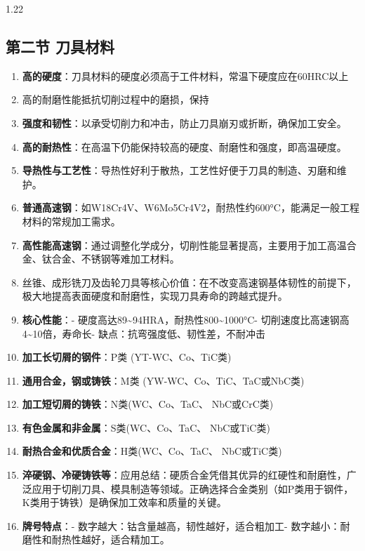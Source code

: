 \documentclass[12pt,a4paper]{article}
\begin{document}
\begin{spacing}{1.22}
\subsection{第二节 刀具材料}
\begin{tcolorbox}[colback=yellow!6,colframe=red!55!black,title=重点,left=1mm,right=1mm]
\begin{enumerate}[leftmargin=2.2em,label=\arabic*.]
  \item \textbf{高的硬度}：刀具材料的硬度必须高于工件材料，常温下硬度应在60HRC以上
  \item 高的耐磨性能抵抗切削过程中的磨损，保持
  \item \textbf{强度和韧性}：以承受切削力和冲击，防止刀具崩刃或折断，确保加工安全。
  \item \textbf{高的耐热性}：在高温下仍能保持较高的硬度、耐磨性和强度，即高温硬度。
  \item \textbf{导热性与工艺性}：导热性好利于散热，工艺性好便于刀具的制造、刃磨和维护。
  \item \textbf{普通高速钢}：如W18Cr4V、W6Mo5Cr4V2，耐热性约600°C，能满足一般工程材料的常规加工需求。
  \item \textbf{高性能高速钢}：通过调整化学成分，切削性能显著提高，主要用于加工高温合金、钛合金、不锈钢等难加工材料。
  \item 丝锥、成形铣刀及齿轮刀具等核心价值：在不改变高速钢基体韧性的前提下，极大地提高表面硬度和耐磨性，实现刀具寿命的跨越式提升。
  \item \textbf{核心性能}：- 硬度高达89\textasciitilde{}94HRA，耐热性800\textasciitilde{}1000°C- 切削速度比高速钢高4\textasciitilde{}10倍，寿命长- 缺点：抗弯强度低、韧性差，不耐冲击
  \item \textbf{加工长切屑的钢件}：P类 (YT-WC、Co、TiC类)
  \item \textbf{通用合金，钢或铸铁}：M类 (YW-WC、Co、TiC、TaC或NbC类)
  \item \textbf{加工短切屑的铸铁}：N类(WC、Co、TaC、 NbC或CrC类)
  \item \textbf{有色金属和非金属}：S类(WC、Co、TaC、 NbC或TiC类)
  \item \textbf{耐热合金和优质合金}：H类(WC、Co、TaC、 NbC或TiC类)
  \item \textbf{淬硬钢、冷硬铸铁等}：应用总结：硬质合金凭借其优异的红硬性和耐磨性，广泛应用于切削刀具、模具制造等领域。正确选择合金类别（如P类用于钢件，K类用于铸铁）是确保加工效率和质量的关键。
  \item \textbf{牌号特点}：- 数字越大：钴含量越高，韧性越好，适合粗加工- 数字越小：耐磨性和耐热性越好，适合精加工。

\end{enumerate}
\end{tcolorbox}
\end{spacing}
\end{document}
